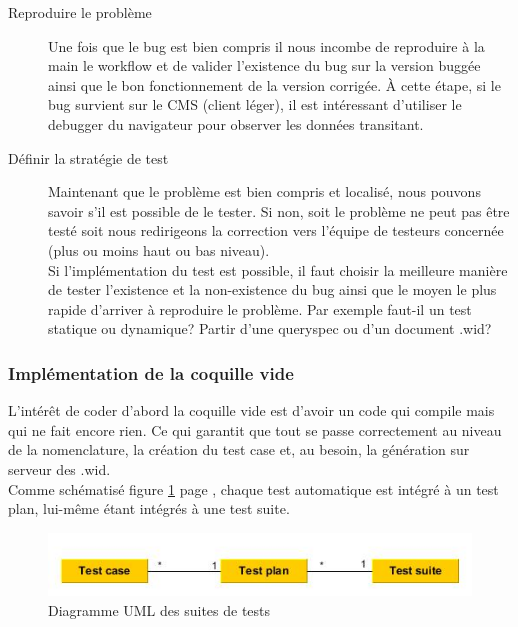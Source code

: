 \begin{description}
	\item[Reproduire le problème] Une fois que le bug est bien compris il nous incombe de reproduire à la main le workflow et de valider l'existence du bug sur la version buggée ainsi que le bon fonctionnement de la version corrigée. \`{A} cette étape, si le bug survient sur le CMS (client léger), il est intéressant d'utiliser le debugger du navigateur pour observer les données transitant.
	
	\item[Définir la stratégie de test] Maintenant que le problème est bien compris et localisé, nous pouvons savoir s'il est possible de le tester. Si non, soit le problème ne peut pas \^{e}tre testé soit nous redirigeons la correction vers l'équipe de testeurs concernée (plus ou moins haut ou bas niveau).\\
Si l'implémentation du test est possible, il faut choisir la meilleure manière de tester l'existence et la non-existence du bug ainsi que le moyen le plus rapide d'arriver à reproduire le problème. Par exemple faut-il un test statique ou dynamique? Partir d'une queryspec ou d'un document .wid?
\end{description}


\subsubsection{Implémentation de la coquille vide}
L'intér\^{e}t de coder d'abord la coquille vide est d'avoir un code qui compile mais qui ne fait encore rien. Ce qui garantit que tout se passe correctement au niveau de la nomenclature, la création du test case et, au besoin, la génération sur serveur des .wid.\\ 
Comme sch\'{e}matis\'{e} figure \ref{figure:testsRelations} page \pageref{figure:testsRelations}, chaque test automatique est int\'{e}gr\'{e} \`{a} un test plan, lui-m\^{e}me \'{e}tant int\'{e}gr\'{e}s \`{a} une test suite.\\
\begin{figure}[!h]
  \centering
      \includegraphics[width=\textwidth]{images/testsRelations.jpg}
  \caption{Diagramme UML des suites de tests}
	\label{figure:testsRelations}
\end{figure}

